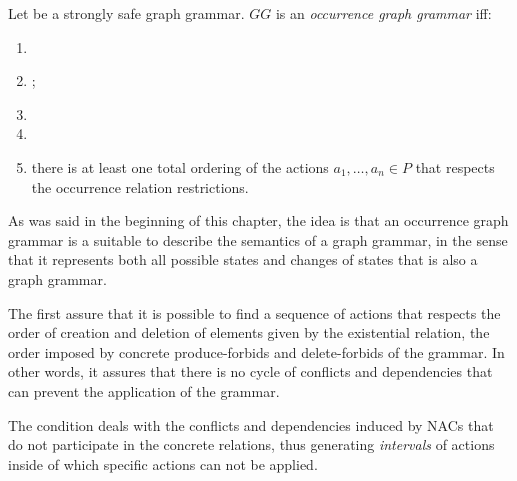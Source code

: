 \begin{definition}\label{def:ogg} Let \doublyTypedGraphGrammarCore{} be a strongly safe graph grammar. $GG$ is an \emph{occurrence graph grammar} iff:

  \begin{enumerate}
    \item {}
    \item {};
    \item {}
    \item {}
    \item there is at least one total ordering of the actions $a_1,\ldots,a_n \in P$ that respects the occurrence relation restrictions.
  \end{enumerate}
\end{definition}

As was said in the beginning of this chapter, the idea is that an occurrence graph grammar is a suitable to describe the semantics of a graph grammar, in the sense that it represents both all possible states and changes of states that is also a graph grammar.

The first  assure that it is possible to find a sequence of actions that respects the order of creation and deletion of elements given by the existential relation,  the order imposed by concrete produce-forbids and delete-forbids of the grammar. In other words, it assures that there is no cycle of conflicts and dependencies that can prevent the application of the grammar.

The  condition deals with the conflicts and dependencies induced by NACs that do not participate in the concrete relations, thus generating \emph{intervals} of actions inside of which specific actions can not be applied. 
